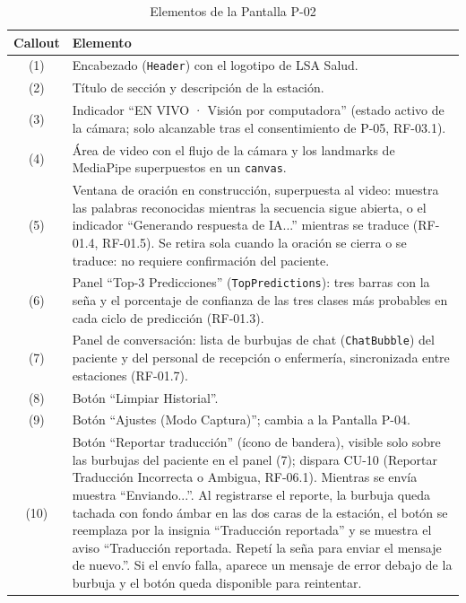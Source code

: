 \begin{table}[H]
    \centering
    \caption{Elementos de la Pantalla P-02}
    \label{tab:mock-p02}
    \begin{tabularx}{\textwidth}{c X}
        \toprule
        \textbf{Callout} & \textbf{Elemento} \\
        \midrule
        (1) & Encabezado (\texttt{Header}) con el logotipo de LSA Salud. \\
        (2) & Título de sección y descripción de la estación. \\
        (3) & Indicador ``EN VIVO · Visión por computadora'' (estado activo
        de la cámara; solo alcanzable tras el consentimiento de P-05, RF-03.1). \\
        (4) & Área de video con el flujo de la cámara y los landmarks
        de MediaPipe superpuestos en un \texttt{canvas}. \\
        (5) & Ventana de oración en construcción, superpuesta al video:
        muestra las palabras reconocidas mientras la secuencia sigue
        abierta, o el indicador ``Generando respuesta de IA...'' mientras
        se traduce (RF-01.4, RF-01.5). Se retira sola cuando la oración se
        cierra o se traduce: no requiere confirmación del paciente. \\
        (6) & Panel ``Top-3 Predicciones'' (\texttt{TopPredictions}): tres
        barras con la seña y el porcentaje de confianza de las tres clases
        más probables en cada ciclo de predicción (RF-01.3). \\
        (7) & Panel de conversación: lista de burbujas de chat
        (\texttt{ChatBubble}) del paciente y del personal de recepción o
        enfermería, sincronizada entre estaciones (RF-01.7). \\
        (8) & Botón ``Limpiar Historial''. \\
        (9) & Botón ``Ajustes (Modo Captura)''; cambia a la Pantalla P-04. \\
        (10) & Botón ``Reportar traducción'' (ícono de bandera), visible
        solo sobre las burbujas del paciente en el panel (7); dispara CU-10
        (Reportar Traducción Incorrecta o Ambigua, RF-06.1). Mientras se
        envía muestra ``Enviando...''. Al registrarse el reporte, la
        burbuja queda tachada con fondo ámbar en las dos caras de la
        estación, el botón se reemplaza por la insignia ``Traducción
        reportada'' y se muestra el aviso ``Traducción reportada. Repetí
        la seña para enviar el mensaje de nuevo.''. Si el envío falla,
        aparece un mensaje de error debajo de la burbuja y el botón queda
        disponible para reintentar. \\
        \bottomrule
    \end{tabularx}
\end{table}

